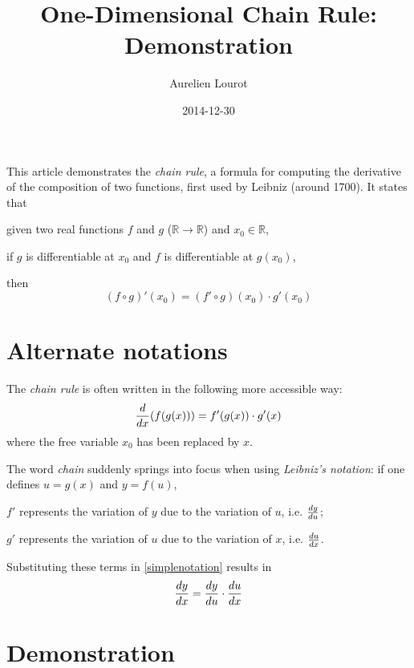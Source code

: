 \documentclass[a4paper]{article}
\title{One-Dimensional Chain Rule: Demonstration}
\author{Aurelien {\sc Lourot}}
\date{2014-12-30}
\begin{document}
    \sloppy

    \maketitle

    This article demonstrates the {\it chain rule}, a formula for computing the
    derivative of the composition of two functions, first used by Leibniz 
    (around 1700). It states that

    \bigskip
    given two real functions $f$ and $g$ ($\mathbb{R} \rightarrow \mathbb{R}$)
    and $x_0 \in \mathbb{R}$, 

    \bigskip
    if $g$ is differentiable at $x_0$ and $f$ is differentiable at $g(x_0)$, 

    \bigskip
    then
    $$
        (f \circ g)'(x_0) = (f' \circ g)(x_0) \cdot g'(x_0)
    $$

    \section{Alternate notations}

    The {\it chain rule} is often written in the following more accessible way:
    \begin{equation}
        \label{simplenotation}
        {d \over dx} (f(g(x))) = f'(g(x)) \cdot g'(x)
    \end{equation}
    where the free variable $x_0$ has been replaced by $x$.

    \bigskip
    The word {\it chain} suddenly springs into focus when using {\it Leibniz's 
    notation}: if one defines $u = g(x)$ and $y = f(u)$, 
    \begin{itemize}
      {
        \item $f'$ represents the variation of $y$ due to the variation of $u$,
              i.e. $dy \over du$;
      }
      {
        \item $g'$ represents the variation of $u$ due to the variation of $x$,
              i.e. $du \over dx$.
      }
    \end{itemize}

    \bigskip
    Substituting these terms in \eqref{simplenotation} results in
    $$
        {dy \over dx} = {dy \over du} \cdot {du \over dx}
    $$

    \section{Demonstration}
\end{document}
